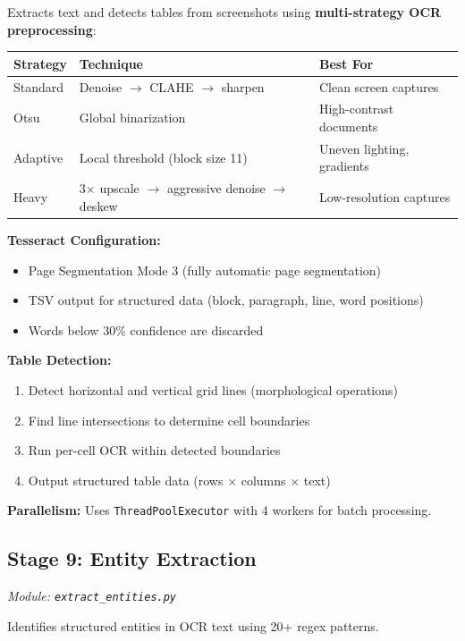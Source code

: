 \documentclass[12pt, a4paper]{article}
\newcommand{\codeinline}[1]{\texttt{\small\colorbox{codebg}{#1}}}
\newcommand{\filepath}[1]{\texttt{\small #1}}
\begin{document}
Extracts text and detects tables from screenshots using \textbf{multi-strategy OCR preprocessing}:

\begin{longtable}{@{} l l l @{}}
    \toprule
    \textbf{Strategy} & \textbf{Technique} & \textbf{Best For} \\
    \midrule
    Standard & Denoise $\rightarrow$ CLAHE $\rightarrow$ sharpen & Clean screen captures \\
    Otsu & Global binarization & High-contrast documents \\
    Adaptive & Local threshold (block size 11) & Uneven lighting, gradients \\
    Heavy & 3$\times$ upscale $\rightarrow$ aggressive denoise $\rightarrow$ deskew & Low-resolution captures \\
    \bottomrule
\end{longtable}

\textbf{Tesseract Configuration:}
\begin{itemize}
    \item Page Segmentation Mode 3 (fully automatic page segmentation)
    \item TSV output for structured data (block, paragraph, line, word positions)
    \item Words below 30\% confidence are discarded
\end{itemize}

\textbf{Table Detection:}
\begin{enumerate}
    \item Detect horizontal and vertical grid lines (morphological operations)
    \item Find line intersections to determine cell boundaries
    \item Run per-cell OCR within detected boundaries
    \item Output structured table data (rows $\times$ columns $\times$ text)
\end{enumerate}

\textbf{Parallelism:} Uses \codeinline{ThreadPoolExecutor} with 4 workers for batch processing.

\subsection{Stage 9: Entity Extraction}
\textit{Module: \filepath{extract\_entities.py}}

Identifies structured entities in OCR text using 20+ regex patterns.
\end{document}
